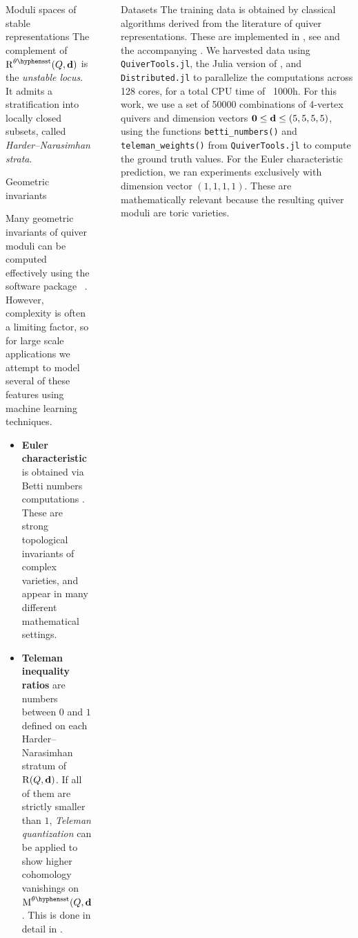 \documentclass[final,20pt]{beamer}
\newlength{\sepwidth}
\newlength{\colwidth}
\newcommand{\separatorcolumn}{\begin{column}{\sepwidth}\end{column}}
\begin{document}
\begin{frame}[t, fragile]
\begin{columns}[t]
\begin{column}{\colwidth}
\begin{block}{Moduli spaces of stable representations}
    The complement of $\repspace^{\theta\semistable}(Q,\tuple{d})$ is the
    \emph{unstable locus}. It admits a stratification into locally closed
    subsets, called \emph{Harder--Narasimhan strata}.
  \end{block}

  \begin{alertblock}{Geometric invariants}

    Many geometric invariants of quiver moduli can be computed effectively
    using the software package \quivertools~\cite{quivertools,2506.19432}.
    However, complexity is often a limiting factor,
    so for large scale applications we attempt to model
    several of these features using machine learning techniques.

    \begin{itemize}
      \item \textbf{Euler characteristic} is obtained
      via Betti numbers computations \cite{MR1974891}.
      These are strong topological invariants of complex varieties,
      and appear in many different mathematical settings.

      \item \textbf{Teleman inequality ratios} are numbers between $0$ and $1$ defined
      on each Harder--Narasimhan stratum of $\operatorname{R}(Q,\mathbf{d})$.
      If all of them are strictly smaller than $1$,
      \emph{Teleman quantization} can be applied to show higher cohomology vanishings
      on $\modulispace^{\theta\semistable}(Q,\tuple{d})$.
      This is done in detail in \cite{2311.17003}.
    \end{itemize}

  \end{alertblock}
\end{column}

\separatorcolumn

\begin{column}{\colwidth}


  \begin{block}{Datasets}
    The training data is obtained by classical algorithms derived from
    the literature of quiver representations. These are implemented in
    \quivertools, see \cite{quivertools} and the accompanying \cite{2506.19432}.
    We harvested data using {\tt{QuiverTools.jl}},
    the Julia version of \quivertools, and {\tt{Distributed.jl}}
    to parallelize the computations across 128 cores,
    for a total CPU time of ~1000h.
    For this work, we use a set of 50000 combinations of 4-vertex quivers
    and dimension vectors $\mathbf{0} \leq \mathbf{d}\leq(5, 5, 5, 5)$, using
    the functions
    \texttt{betti_numbers()} and \texttt{teleman_weights()}
    from {\tt{QuiverTools.jl}} to compute the ground truth values.
    For the Euler characteristic prediction, we ran experiments
    exclusively with dimension vector $(1, 1, 1, 1)$.
    These are mathematically relevant because the resulting quiver moduli
    are toric varieties.
  \end{block}


\end{column}
\end{columns}
\end{frame}
\end{document}
